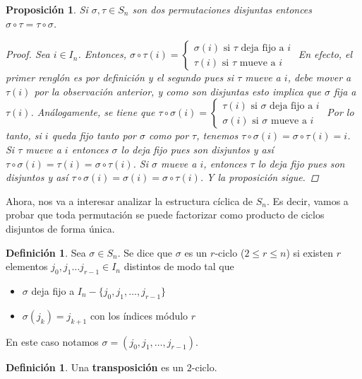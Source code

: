 \documentclass[12pt]{book}
\newtheorem{prop}[teo]{Proposición}
\theoremstyle{definition}
\newtheorem{defn}[teo]{Definición}
\begin{document}
\begin{prop}\label{prop::disjuntosconmutan}
Si $\sigma,\tau \in S_n$ son dos permutaciones disjuntas entonces $\sigma \circ \tau = \tau \circ \sigma$.

\begin{proof}
Sea $i\in I_n$. Entonces, $\sigma\circ\tau (i)=\begin{cases}\sigma(i) \text{ si } \tau \text{ deja fijo a } i \\ \tau(i) \text{ si } \tau \text{ mueve a } i\end{cases}$ En efecto, el primer renglón es por definición y el segundo pues si $\tau$ mueve a $i$, debe mover a $\tau(i)$ por la observación anterior, y como son disjuntas esto implica que $\sigma$ fija a $\tau(i)$. Análogamente, se tiene que $\tau\circ\sigma (i)=\begin{cases}\tau(i) \text{ si } \sigma \text{ deja fijo a } i \\ \sigma(i) \text{ si } \sigma \text{ mueve a } i\end{cases}$ Por lo tanto, si $i$ queda fijo tanto por $\sigma$ como por $\tau$, tenemos $\tau\circ\sigma (i)=\sigma\circ\tau (i) = i$. Si $\tau$ mueve a $i$ entonces $\sigma$ lo deja fijo pues son disjuntos y así $\tau\circ\sigma (i) = \tau(i) = \sigma\circ\tau(i)$. Si $\sigma$ mueve a $i$, entonces $\tau$ lo deja fijo pues son disjuntos y así $\tau\circ\sigma(i)=\sigma(i)=\sigma\circ\tau(i)$. Y la proposición sigue.
\end{proof}
\end{prop}

Ahora, nos va a interesar analizar la estructura cíclica de $S_n$. Es decir, vamos a probar que toda permutación se puede factorizar como producto de ciclos disjuntos de forma única.

\begin{defn}
Sea $\sigma\in S_n$. Se dice que $\sigma$ es un $r$-ciclo ($2\leq r\leq n$) si existen $r$ elementos $j_0,j_1\ldots j_{r-1}\in I_n$ distintos de modo tal que \begin{itemize}\item $\sigma$ deja fijo a $I_n - \{j_0,j_1,\ldots ,j_{r-1}\}$ \item $\sigma(j_{k})=j_{k+1}$ con los índices módulo $r$\end{itemize}
En este caso notamos $\sigma = (j_0, j_1, \ldots , j_{r-1})$.
\end{defn}

\begin{defn}
Una \textbf{transposición} es un $2$-ciclo.
\end{defn}
\end{document}
